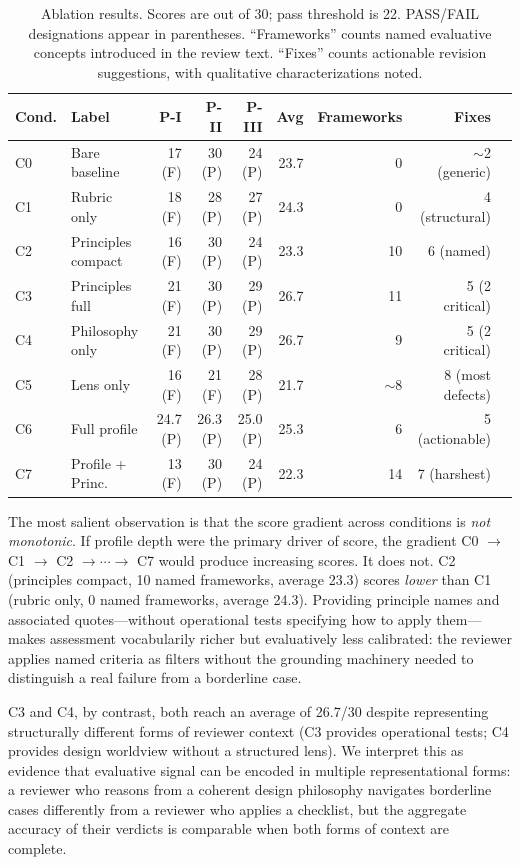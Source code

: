\begin{table}[h]
\centering
\caption{Ablation results. Scores are out of 30; pass threshold is 22. PASS/FAIL designations appear in parentheses. ``Frameworks'' counts named evaluative concepts introduced in the review text. ``Fixes'' counts actionable revision suggestions, with qualitative characterizations noted.}
\begin{tabular}{llrrrrrrl}
\toprule
Cond. & Label & P-I & P-II & P-III & Avg & Frameworks & Fixes \\
\midrule
C0 & Bare baseline     & 17 (F) & 30 (P) & 24 (P) & 23.7 & 0  & $\sim$2 (generic) \\
C1 & Rubric only       & 18 (F) & 28 (P) & 27 (P) & 24.3 & 0  & 4 (structural) \\
C2 & Principles compact & 16 (F) & 30 (P) & 24 (P) & 23.3 & 10 & 6 (named) \\
C3 & Principles full   & 21 (F) & 30 (P) & 29 (P) & 26.7 & 11 & 5 (2 critical) \\
C4 & Philosophy only   & 21 (F) & 30 (P) & 29 (P) & 26.7 & 9  & 5 (2 critical) \\
C5 & Lens only         & 16 (F) & 21 (F) & 28 (P) & 21.7 & $\sim$8 & 8 (most defects) \\
C6 & Full profile      & 24.7 (P) & 26.3 (P) & 25.0 (P) & 25.3 & 6 & 5 (actionable) \\
C7 & Profile + Princ.  & 13 (F) & 30 (P) & 24 (P) & 22.3 & 14 & 7 (harshest) \\
\bottomrule
\end{tabular}
\label{tab:ablation}
\end{table}

The most salient observation is that the score gradient across conditions is \emph{not monotonic}. If profile depth were the primary driver of score, the gradient C0 $\to$ C1 $\to$ C2 $\to \cdots \to$ C7 would produce increasing scores. It does not. C2 (principles compact, 10 named frameworks, average 23.3) scores \emph{lower} than C1 (rubric only, 0 named frameworks, average 24.3). Providing principle names and associated quotes---without operational tests specifying how to apply them---makes assessment vocabularily richer but evaluatively less calibrated: the reviewer applies named criteria as filters without the grounding machinery needed to distinguish a real failure from a borderline case.

C3 and C4, by contrast, both reach an average of 26.7/30 despite representing structurally different forms of reviewer context (C3 provides operational tests; C4 provides design worldview without a structured lens). We interpret this as evidence that evaluative signal can be encoded in multiple representational forms: a reviewer who reasons from a coherent design philosophy navigates borderline cases differently from a reviewer who applies a checklist, but the aggregate accuracy of their verdicts is comparable when both forms of context are complete.

